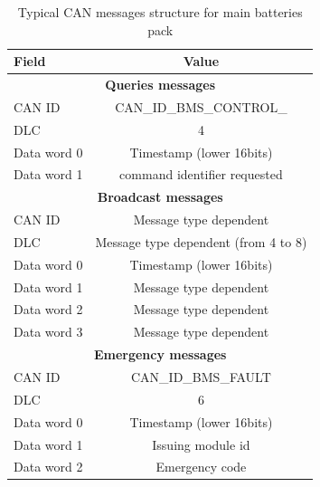 \begin{table}[!hb]
	\centering
	\begin{tabular}{lc}
		\toprule
		\textbf{Field} & \textbf{Value}\\
		\midrule
		\multicolumn{2}{c}{\textbf{Queries messages}}\\
		\midrule
		CAN ID & CAN\_ID\_BMS\_CONTROL\_\\
		DLC & 4\\
		Data word 0 & Timestamp (lower 16bits)\\
		Data word 1 & command identifier requested\\
		\midrule
		\multicolumn{2}{c}{\textbf{Broadcast messages}}\\
		\midrule
		CAN ID & Message type dependent \\
		DLC & Message type dependent (from 4 to 8)\\
		Data word 0 & Timestamp (lower 16bits)\\
		Data word 1 & Message type dependent \\
		Data word 2 & Message type dependent \\
		Data word 3 & Message type dependent \\
		\midrule
		\multicolumn{2}{c}{\textbf{Emergency messages}}\\
		\midrule
		CAN ID & CAN\_ID\_BMS\_FAULT\\	
		DLC & 6\\	
		Data word 0 & Timestamp (lower 16bits)\\	
		Data word 1 & Issuing module id\\
		Data word 2 &Emergency code\\	
		\bottomrule
	\end{tabular}
	\caption{Typical CAN messages structure for main batteries pack}
	\label{tab:can_structure_main_battery}
\end{table}

